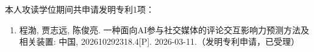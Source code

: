 \begin{publication}
本人攻读学位期间共申请发明专利1项：
\begin{enumerate}
\item 程渤, 贾志远, 陈俊亮. 一种面向AI参与社交媒体的评论交互影响力预测方法及相关装置: 中国, 202610292318.4[P]. 2026-03-11.（发明专利申请，已受理）
\end{enumerate}

\end{publication}

